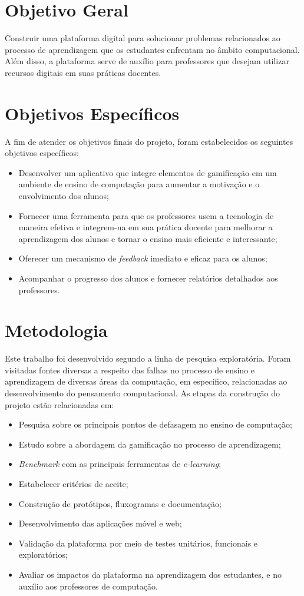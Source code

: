 \section{Objetivo Geral}
Construir uma plataforma digital para solucionar problemas relacionados ao processo de aprendizagem que os estudantes enfrentam no âmbito computacional. Além disso, a plataforma serve de auxílio para professores que desejam utilizar recursos digitais em suas práticas docentes.

\section{Objetivos Específicos}

A fim de atender os objetivos finais do projeto, foram estabelecidos os seguintes objetivos específicos:

\begin{itemize}
  \item Desenvolver um aplicativo que integre elementos de gamificação em um ambiente de ensino de computação para aumentar a motivação e o envolvimento dos alunos;
  \item Fornecer uma ferramenta para que os professores usem a tecnologia de maneira efetiva e integrem-na em sua prática docente para melhorar a aprendizagem dos alunos e tornar o ensino mais eficiente e interessante;
  \item Oferecer um mecanismo de \textit{feedback} imediato e eficaz para os alunos;
  \item Acompanhar o progresso dos alunos e fornecer relatórios detalhados aos professores.
\end{itemize}

\section{Metodologia}
Este trabalho foi desenvolvido segundo a linha de pesquisa exploratória. Foram visitadas fontes diversas a respeito das falhas no processo de ensino e aprendizagem de diversas áreas da computação, em específico, relacionadas ao desenvolvimento do pensamento computacional. As etapas da construção do projeto estão relacionadas em:

\begin{itemize}
  \item Pesquisa sobre os principais pontos de defasagem no ensino de computação;
  \item Estudo sobre a abordagem da gamificação no processo de aprendizagem;
  \item \textit{Benchmark} com as principais ferramentas de \textit{e-learning};
  \item Estabelecer critérios de aceite;
  \item Construção de protótipos, fluxogramas e documentação;
  \item Desenvolvimento das aplicações móvel e web;
  \item Validação da plataforma por meio de testes unitários, funcionais e exploratórios;
  \item Avaliar os impactos da plataforma na aprendizagem dos estudantes, e no auxílio aos professores de computação.
\end{itemize}

